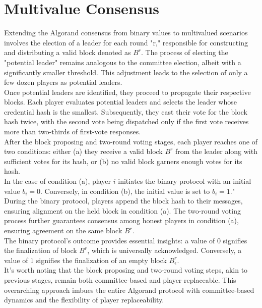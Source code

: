 \section{Multivalue Consensus}
Extending the Algorand consensus from binary values to multivalued scenarios involves the election of a leader for each round "r," responsible for constructing and distributing a valid block denoted as $B^{r}$. The process of electing the "potential leader" remains analogous to the committee election, albeit with a significantly smaller threshold. This adjustment leads to the selection of only a few dozen players as potential leaders.\\
Once potential leaders are identified, they proceed to propagate their respective blocks. Each player evaluates potential leaders and selects the leader whose credential hash is the smallest. Subsequently, they cast their vote for the block hash twice, with the second vote being dispatched only if the first vote receives more than two-thirds of first-vote responses.\\
After the block proposing and two-round voting stages, each player reaches one of two conditions: either (a) they receive a valid block $B^{r}$ from the leader along with sufficient votes for its hash, or (b) no valid block garners enough votes for its hash.\\
In the case of condition (a), player $i$ initiates the binary protocol with an initial value $b_{i} = 0$. Conversely, in condition (b), the initial value is set to $b_{i} = 1$." During the binary protocol, players append the block hash to their messages, ensuring alignment on the held block in condition (a). The two-round voting process further guarantees consensus among honest players in condition (a), ensuring agreement on the same block $B^{r}$.\\
The binary protocol's outcome provides essential insights: a value of $0$ signifies the finalization of block $B^{r}$, which is universally acknowledged. Conversely, a value of $1$ signifies the finalization of an empty block $B_\epsilon^{r}$.\\
It's worth noting that the block proposing and two-round voting steps, akin to previous stages, remain both committee-based and player-replaceable. This overarching approach imbues the entire Algorand protocol with committee-based dynamics and the flexibility of player replaceability.
